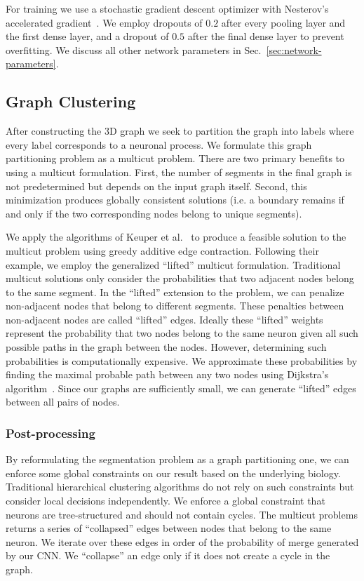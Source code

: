 For training we use a stochastic gradient descent optimizer with Nesterov's accelerated gradient~\cite{nesterov1983method}. 
We employ dropouts of $0.2$ after every pooling layer and the first dense layer, and a dropout of $0.5$ after the final dense layer to prevent overfitting. 
We discuss all other network parameters in Sec.~\ref{sec:network-parameters}.

\subsection{Graph Clustering}

After constructing the 3D graph we seek to partition the graph into labels where every label corresponds to a neuronal process. 
We formulate this graph partitioning problem as a multicut problem.
There are two primary benefits to using a multicut formulation. 
First, the number of segments in the final graph is not predetermined but depends on the input graph itself. 
Second, this minimization produces globally consistent solutions (i.e. a boundary remains if and only if the two corresponding nodes belong to unique segments).

We apply the algorithms of Keuper et al.~\cite{keuper2015efficient} to produce a feasible solution to the multicut problem using greedy additive edge contraction.
Following their example, we employ the generalized ``lifted'' multicut formulation.
Traditional multicut solutions only consider the probabilities that two adjacent nodes belong to the same segment. 
In the ``lifted'' extension to the problem, we can penalize non-adjacent nodes that belong to different segments. 
These penalties between non-adjacent nodes are called ``lifted'' edges. 
Ideally these ``lifted'' weights represent the probability that two nodes belong to the same neuron given all such possible paths in the graph between the nodes.
However, determining such probabilities is computationally expensive.
We approximate these probabilities by finding the maximal probable path between any two nodes using Dijkstra's algorithm~\cite{keuper2015efficient}.
Since our graphs are sufficiently small, we can generate ``lifted'' edges between all pairs of nodes. 

\subsubsection{Post-processing}

By reformulating the segmentation problem as a graph partitioning one, we can enforce some global constraints on our result based on the underlying biology.
Traditional hierarchical clustering algorithms do not rely on such constraints but consider local decisions independently.
We enforce a global constraint that neurons are tree-structured and should not contain cycles. 
The multicut problems returns a series of ``collapsed'' edges between nodes that belong to the same neuron.
We iterate over these edges in order of the probability of merge generated by our CNN. 
We ``collapse'' an edge only if it does not create a cycle in the graph.
